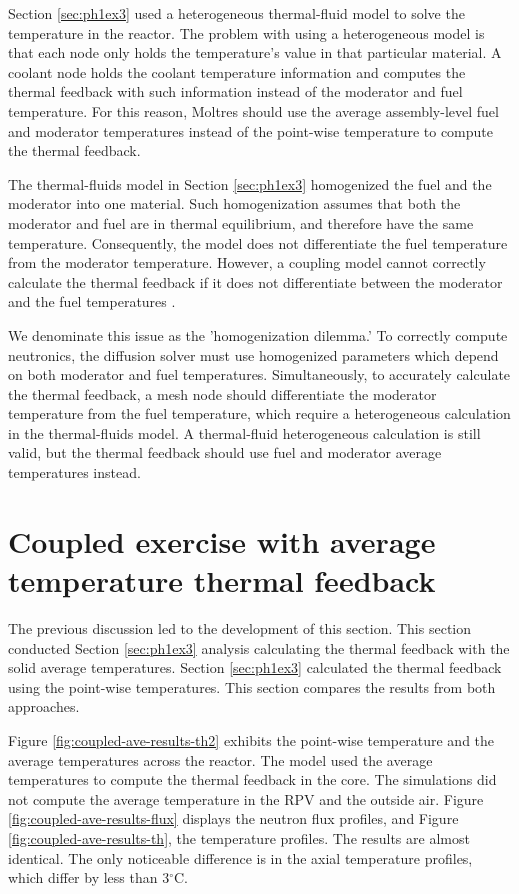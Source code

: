 Section \ref{sec:ph1ex3} used a heterogeneous thermal-fluid model to solve the temperature in the reactor.
The problem with using a heterogeneous model is that each node only holds the temperature's value in that particular material.
A coolant node holds the coolant temperature information and computes the thermal feedback with such information instead of the moderator and fuel temperature.
For this reason, Moltres should use the average assembly-level fuel and moderator temperatures instead of the point-wise temperature to compute the thermal feedback.

The thermal-fluids model in Section \ref{sec:ph1ex3} homogenized the fuel and the moderator into one material.
Such homogenization assumes that both the moderator and fuel are in thermal equilibrium, and therefore have the same temperature.
Consequently, the model does not differentiate the fuel temperature from the moderator temperature.
However, a coupling model cannot correctly calculate the thermal feedback if it does not differentiate between the moderator and the fuel temperatures \cite{damian_vhtr_2008}.

We denominate this issue as the 'homogenization dilemma.'
To correctly compute neutronics, the diffusion solver must use homogenized parameters which depend on both moderator and fuel temperatures.
Simultaneously, to accurately calculate the thermal feedback, a mesh node should differentiate the moderator temperature from the fuel temperature, which require a heterogeneous calculation in the thermal-fluids model.
A thermal-fluid heterogeneous calculation is still valid, but the thermal feedback should use fuel and moderator average temperatures instead.

\section{Coupled exercise with average temperature thermal feedback}
\label{sec:coupled-average}

The previous discussion led to the development of this section.
This section conducted Section \ref{sec:ph1ex3} analysis calculating the thermal feedback with the solid average temperatures.
Section \ref{sec:ph1ex3} calculated the thermal feedback using the point-wise temperatures.
This section compares the results from both approaches.

Figure \ref{fig:coupled-ave-results-th2} exhibits the point-wise temperature and the average temperatures across the reactor.
The model used the average temperatures to compute the thermal feedback in the core.
The simulations did not compute the average temperature in the RPV and the outside air.
Figure \ref{fig:coupled-ave-results-flux} displays the neutron flux profiles, and Figure \ref{fig:coupled-ave-results-th}, the temperature profiles.
The results are almost identical.
The only noticeable difference is in the axial temperature profiles, which differ by less than 3$^{\circ}$C.

